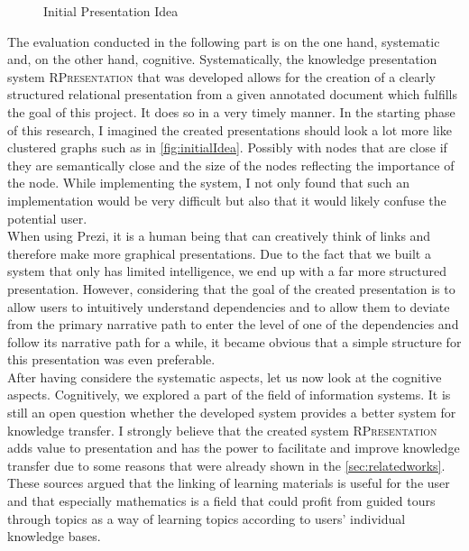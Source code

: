 \documentclass[twoside, 12pt]{article}
\newcommand{\sys}{\textsc{RPresentation}\xspace}
\begin{document}
\begin{figure}
\vspace{-28pt}
  \begin{center}
\vspace{-20pt}
  \caption{Initial Presentation Idea}
  \label{fig:initialIdea}
\vspace{-24pt}
  \end{center}
\end{figure}

The evaluation conducted in the following part is on the one hand, systematic and, on the other hand, cognitive. Systematically, the knowledge presentation system \sys that was developed allows for the creation of a clearly structured relational presentation from a given annotated document which fulfills the goal of this project. It does so in a very timely manner. In the starting phase of this research, I imagined the created presentations should look a lot more like clustered graphs such as in \autoref{fig:initialIdea}. Possibly with nodes that are close if they are semantically close and the size of the nodes reflecting the importance of the node. While implementing the system, I not only found that such an implementation would be very difficult but also that it would likely confuse the potential user.\\

When using Prezi, it is a human being that can creatively think of links and therefore make more graphical presentations. Due to the fact that we built a system that only has limited intelligence, we end up with a far more structured presentation. However, considering that the goal of the created presentation is to allow users to intuitively understand dependencies and to allow them to deviate from the primary narrative path to enter the level of one of the dependencies and follow its narrative path for a while, it became obvious that a simple structure for this presentation was even preferable.\\

After having considere the systematic aspects, let us now look at the cognitive aspects. Cognitively, we explored a part of the field of information systems. It is still an open question whether the developed system provides a better system for knowledge transfer. I strongly believe that the created system \sys adds value to presentation and has the power to facilitate and improve knowledge transfer due to some reasons that were already shown in the \autoref{sec:relatedworks}. These sources argued that the linking of learning materials is useful for the user and that especially mathematics is a field that could profit from guided tours through topics as a way of learning topics according to users' individual knowledge bases.\\
\end{document}
